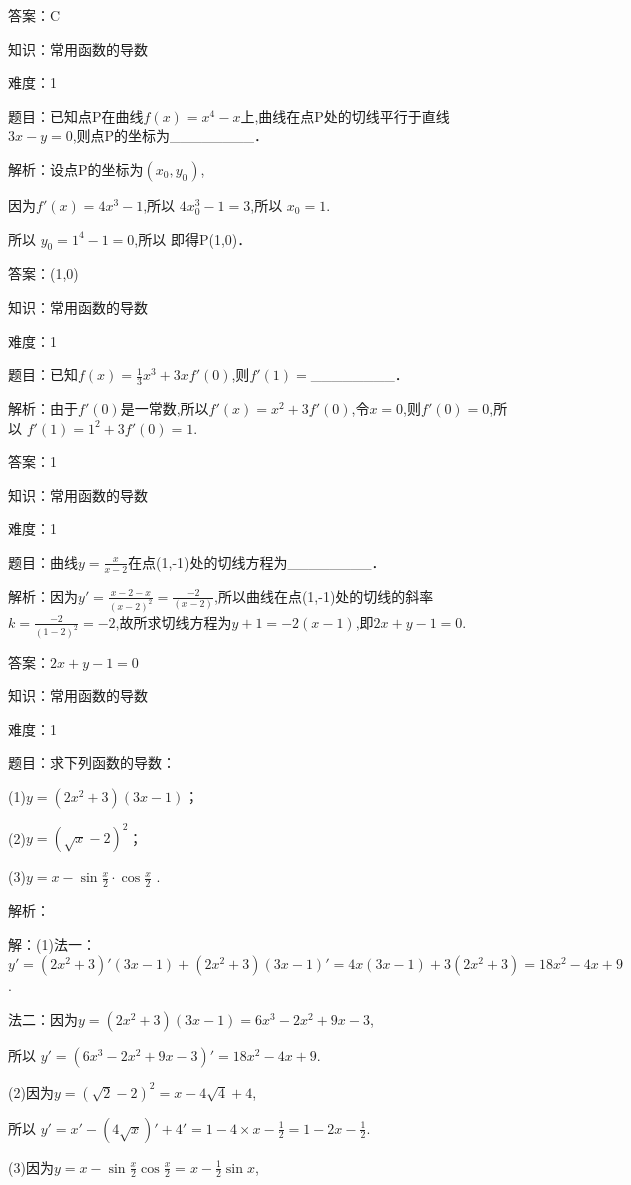 \documentclass{article} %
\begin{document}
答案：C



知识：常用函数的导数

难度：1

题目：已知点P在曲线$f(x)=x^{4}-x$上,曲线在点P处的切线平行于直线$3x-y=0$,则点P的坐标为\_\_\_\_\_\_\_\_．

解析：设点P的坐标为$(x_{0},y_{0})$,

因为$f'(x)=4x^{3}-1$,所以 $4x_0^3-1=3$,所以 $x_{0}=1$.

所以 $y_{0}=1^{4}-1=0$,所以 即得P(1,0)．

答案：(1,0)

知识：常用函数的导数

难度：1

题目：已知$f(x)=\frac{1}{3}x^{3}+3xf'(0)$,则$f'(1)=$\_\_\_\_\_\_\_\_．

解析：由于$f'(0)$是一常数,所以$f'(x)=x^{2}+3f'(0)$,令$x=0$,则$f'(0)=0$,所以 $f'(1)=1^{2}+3f'(0)=1$.

答案：1



知识：常用函数的导数

难度：1

题目：曲线$y=\frac{x}{x-2}$在点(1,-1)处的切线方程为\_\_\_\_\_\_\_\_．

解析：因为$y'=\frac{x-2-x}{{(x-2)}^2}=\frac{-2}{(x-2)}$,所以曲线在点(1,-1)处的切线的斜率$k=\frac{-2}{{(1-2)}^2}=-2$,故所求切线方程为$y+1=-2(x-1)$,即$2x+y-1=0$.

答案：$2x+y-1=0$



知识：常用函数的导数

难度：1

题目：求下列函数的导数：

(1)$y=(2x^{2}+3)(3x-1)$；

(2)$y=(\sqrt{x}-2)^{2}$；

(3)$y=x-\sin\frac{x}{2}\cdot \cos\frac{x}{2}$ .

解析：

解：(1)法一：$y'=(2x^{2}+3)'(3x-1)+(2x^{2}+3)(3x-1)'=4x(3x-1)+3(2x^{2}+3)=18x^{2}-4x+9$.

法二：因为$y=(2x^{2}+3)(3x-1)=6x^{3}-2x^{2}+9x-3$,

所以 $y'=(6x^{3}-2x^{2}+9x-3)'=18x^{2}-4x+9$.

(2)因为$y=(\sqrt{2}-2)^{2}=x-4\sqrt{4}+4$,

所以 $y'=x'-(4\sqrt{x})'+4'=1-4\times x-\frac{1}{2}=1-2x-\frac{1}{2}$.

(3)因为$y=x-\sin\frac{x}{2}\cos\frac{x}{2} =x-\frac{1}{2}\sin x$,
\end{document}
